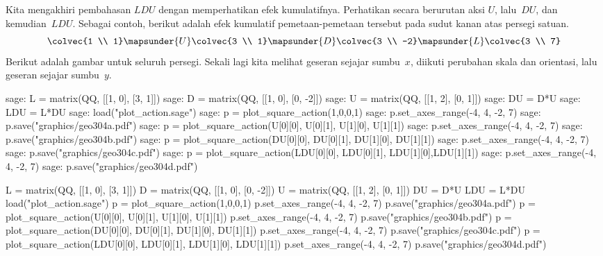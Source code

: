 Kita mengakhiri pembahasan $LDU$ dengan memperhatikan efek kumulatifnya.
Perhatikan secara berurutan aksi $U$, lalu~$DU$, dan kemudian~$LDU$.
Sebagai contoh, berikut adalah efek kumulatif pemetaan-pemetaan tersebut pada
sudut kanan atas persegi satuan.
\begin{equation*}
  \colvec{1 \\ 1}
  \mapsunder{U}
  \colvec{3 \\ 1}
  \mapsunder{D}
  \colvec{3 \\ -2}
  \mapsunder{L}
  \colvec{3 \\ 7}
\end{equation*}
Berikut adalah gambar untuk seluruh persegi.
Sekali lagi kita melihat geseran sejajar sumbu~$x$, diikuti perubahan skala dan
orientasi, lalu geseran sejajar sumbu~$y$.
\begin{sagecommandline}
sage: L = matrix(QQ, [[1, 0], [3, 1]])
sage: D = matrix(QQ, [[1, 0], [0, -2]])
sage: U = matrix(QQ, [[1, 2], [0, 1]])
sage: DU = D*U
sage: LDU = L*DU  
sage: load("plot_action.sage")
sage: p = plot_square_action(1,0,0,1) 
sage: p.set_axes_range(-4, 4, -2, 7) 
sage: p.save("graphics/geo304a.pdf")
sage: p = plot_square_action(U[0][0], U[0][1], U[1][0], U[1][1]) 
sage: p.set_axes_range(-4, 4, -2, 7) 
sage: p.save("graphics/geo304b.pdf")
sage: p = plot_square_action(DU[0][0], DU[0][1], DU[1][0], DU[1][1]) 
sage: p.set_axes_range(-4, 4, -2, 7) 
sage: p.save("graphics/geo304c.pdf")
sage: p = plot_square_action(LDU[0][0], LDU[0][1], LDU[1][0],LDU[1][1]) 
sage: p.set_axes_range(-4, 4, -2, 7) 
sage: p.save("graphics/geo304d.pdf")
\end{sagecommandline}
\begin{sagesilent}
L = matrix(QQ, [[1, 0], [3, 1]])
D = matrix(QQ, [[1, 0], [0, -2]])
U = matrix(QQ, [[1, 2], [0, 1]])
DU = D*U
LDU = L*DU  
load("plot_action.sage")
p = plot_square_action(1,0,0,1) 
p.set_axes_range(-4, 4, -2, 7) 
p.save("graphics/geo304a.pdf")
p = plot_square_action(U[0][0], U[0][1], U[1][0], U[1][1]) 
p.set_axes_range(-4, 4, -2, 7) 
p.save("graphics/geo304b.pdf")
p = plot_square_action(DU[0][0], DU[0][1], DU[1][0], DU[1][1]) 
p.set_axes_range(-4, 4, -2, 7) 
p.save("graphics/geo304c.pdf")
p = plot_square_action(LDU[0][0], LDU[0][1], LDU[1][0], LDU[1][1]) 
p.set_axes_range(-4, 4, -2, 7) 
p.save("graphics/geo304d.pdf")
\end{sagesilent}
